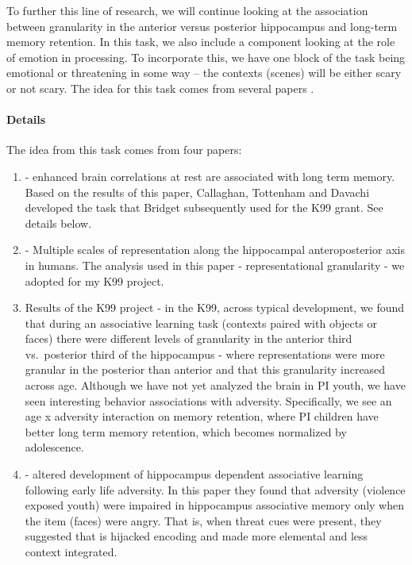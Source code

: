 \documentclass[
]{book}
\providecommand{\tightlist}{%
  \setlength{\itemsep}{0pt}\setlength{\parskip}{0pt}}
\begin{document}
To further this line of research, we will continue looking at the association between granularity in the anterior versus posterior hippocampus and long-term memory retention. In this task, we also include a component looking at the role of emotion in processing. To incorporate this, we have one block of the task being emotional or threatening in some way -- the contexts (scenes) will be either scary or not scary. The idea for this task comes from several papers \citep{brunec_2018, lambert_2019, tambini_2010}.

\hypertarget{details-2}{%
\paragraph{Details}\label{details-2}}

The idea from this task comes from four papers:

\begin{enumerate}
\def\labelenumi{\arabic{enumi}.}
\tightlist
\item
  \citet{tambini_2010} - enhanced brain correlations at rest are associated with long term memory. Based on the results of this paper, Callaghan, Tottenham and Davachi developed the task that Bridget subsequently used for the K99 grant. See details below.
\item
  \citet{brunec_2018} - Multiple scales of representation along the hippocampal anteroposterior axis in humans. The analysis used in this paper - representational granularity - we adopted for my K99 project.
\item
  Results of the K99 project - in the K99, across typical development, we found that during an associative learning task (contexts paired with objects or faces) there were different levels of granularity in the anterior third vs.~posterior third of the hippocampus - where representations were more granular in the posterior than anterior and that this granularity increased across age. Although we have not yet analyzed the brain in PI youth, we have seen interesting behavior associations with adversity. Specifically, we see an age x adversity interaction on memory retention, where PI children have better long term memory retention, which becomes normalized by adolescence.
\item
  \citet{lambert_2019} - altered development of hippocampus dependent associative learning following early life adversity. In this paper they found that adversity (violence exposed youth) were impaired in hippocampus associative memory only when the item (faces) were angry. That is, when threat cues were present, they suggested that is hijacked encoding and made more elemental and less context integrated.
\end{enumerate}
\end{document}
